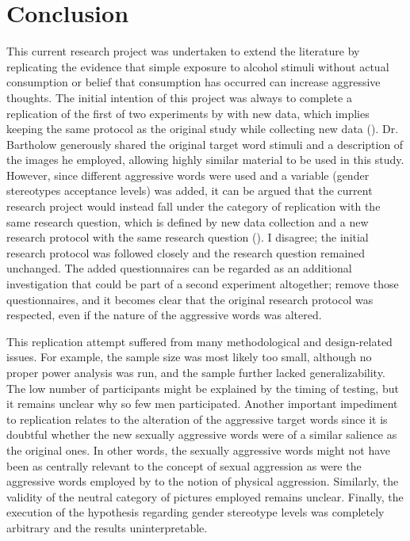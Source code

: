 \documentclass[serif, authordate, twocolumn, empirical]{jote-article}
\begin{document}
\section*{Conclusion} %
\label{sec:conclusion}

This current research project was undertaken to extend the literature by replicating the evidence that simple exposure to alcohol stimuli without actual consumption or belief that consumption has occurred can increase aggressive thoughts. The initial intention of this project was always to complete a replication of the first of two experiments by \textcite{BartholowHeinz2006} with new data, which implies keeping the same protocol as the original study while collecting new data (\cite{NWO}). Dr. Bartholow generously shared the original target word stimuli and a description of the images he employed, allowing highly similar material to be used in this study. However, since different aggressive words were used and a variable (gender stereotypes acceptance levels) was added, it can be argued that the current research project would instead fall under the category of replication with the same research question, which is defined by new data collection and a new research protocol with the same research question (\cite{NWO}). I disagree; the initial research protocol was followed closely and the research question remained unchanged. The added questionnaires can be regarded as an additional investigation that could be part of a second experiment altogether; remove those questionnaires, and it becomes clear that the original research protocol was respected, even if the nature of the aggressive words was altered.

This replication attempt suffered from many methodological and design-related issues. For example, the sample size was most likely too small, although no proper power analysis was run, and the sample further lacked generalizability. The low number of participants might be explained by the timing of testing, but it remains unclear why so few men participated. Another important impediment to replication relates to the alteration of the aggressive target words since it is doubtful whether the new sexually aggressive words were of a similar salience as the original ones. In other words, the sexually aggressive words might not have been as centrally relevant to the concept of sexual aggression as were the aggressive words employed by \textcite{BartholowHeinz2006} to the notion of physical aggression. Similarly, the validity of the neutral category of pictures employed remains unclear. Finally, the execution of the hypothesis regarding gender stereotype levels was completely arbitrary and the results uninterpretable.
\end{document}
